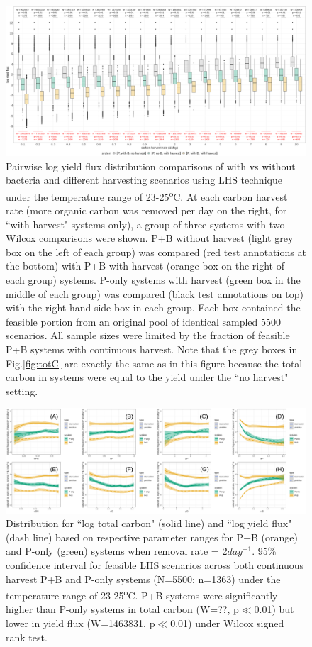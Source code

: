 \documentclass[../thesis.tex]{subfiles} %
\begin{document}
\begin{figure}[H]
    \centering
    \includegraphics[width=\linewidth]{../result/yield.png}
    \caption[Pairwise log yield flux]{Pairwise log yield flux distribution comparisons of with vs without bacteria and different harvesting scenarios using LHS technique under the temperature range of 23-25\textsuperscript{o}C.  {\scriptsize At each carbon harvest rate (more organic carbon was removed per day on the right, for ``with harvest" systems only), a group of three systems with two Wilcox comparisons were shown.  P+B without harvest (light grey box on the left of each group) was compared (red test annotations at the bottom) with P+B with harvest (orange box on the right of each group) systems.  P-only systems with harvest (green box in the middle of each group) was compared (black test annotations on top) with the right-hand side box in each group.  Each box contained the feasible portion from an original pool of identical sampled 5500 scenarios.  All sample sizes were limited by the fraction of feasible P+B systems with continuous harvest.  Note that the grey boxes in Fig.\ref{fig:totC} are exactly the same as in this figure because the total carbon in systems were equal to the yield under the ``no harvest" setting.}}
    \label{fig:yield}
\end{figure}

\begin{figure}[H]
    \centering
    \includegraphics[width=\linewidth]{../result/var_100.png}
    \caption[Log carbon distribution for $x=2day^{-1}$ by parameter]{Distribution for ``log total carbon" (solid line) and ``log yield flux" (dash line) based on respective parameter ranges for P+B (orange) and P-only (green) systems when removal rate = 2$day^{-1}$.  {\scriptsize 95\% confidence interval for feasible LHS scenarios across both continuous harvest P+B and P-only systems (N=5500; n=1363) under the temperature range of 23-25\textsuperscript{o}C.  P+B systems were significantly higher than P-only systems in total carbon (W=??, p$\ll$0.01) but lower in yield flux (W=1463831, p$\ll$0.01) under Wilcox signed rank test.}}
    \label{fig:v2}
\end{figure}
\end{document}
